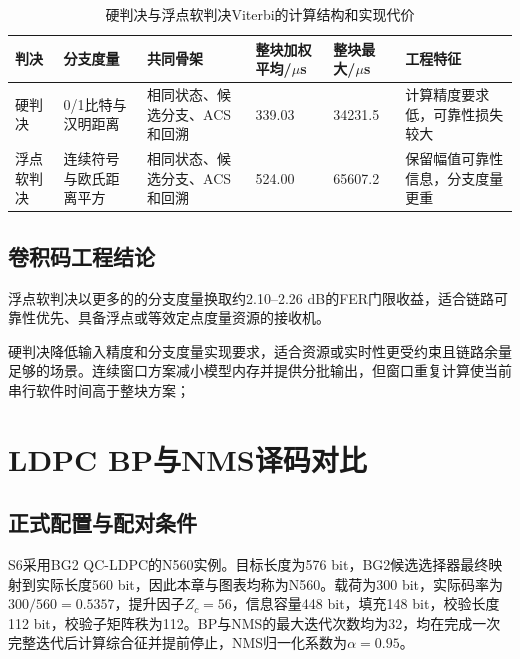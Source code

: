 \begin{table}[htbp]
  \centering
  \scriptsize
  \caption{硬判决与浮点软判决Viterbi的计算结构和实现代价}
  \label{tab:s6-cc-cost}
  \setlength{\tabcolsep}{2.0pt}
  \begin{tabular}{p{}p{}p{}p{}p{}p{}}
    \toprule
    判决 & 分支度量 & 共同骨架 & 整块加权平均/$\mu$s & 整块最大/$\mu$s & 工程特征 \\
    \midrule
    硬判决 & 0/1比特与汉明距离 & 相同状态、候选分支、ACS和回溯 & 339.03 & 34231.5 & 计算精度要求低，可靠性损失较大 \\
    浮点软判决 & 连续符号与欧氏距离平方 & 相同状态、候选分支、ACS和回溯 & 524.00 & 65607.2 & 保留幅值可靠性信息，分支度量更重 \\
    \bottomrule
  \end{tabular}
\end{table}

\subsection{卷积码工程结论}

浮点软判决以更多的的分支度量换取约2.10--2.26 dB的FER门限收益，适合链路可靠性优先、具备浮点或等效定点度量资源的接收机。

硬判决降低输入精度和分支度量实现要求，适合资源或实时性更受约束且链路余量足够的场景。连续窗口方案减小模型内存并提供分批输出，但窗口重复计算使当前串行软件时间高于整块方案；

\section{LDPC BP与NMS译码对比}

\subsection{正式配置与配对条件}

S6采用BG2 QC-LDPC的N560实例。目标长度为576 bit，BG2候选选择器最终映射到实际长度560 bit，因此本章与图表均称为N560。载荷为300 bit，实际码率为$300/560=0.5357$，提升因子$Z_c=56$，信息容量448 bit，填充148 bit，校验长度112 bit，校验子矩阵秩为112。BP与NMS的最大迭代次数均为32，均在完成一次完整迭代后计算综合征并提前停止，NMS归一化系数为$\alpha=0.95$。

